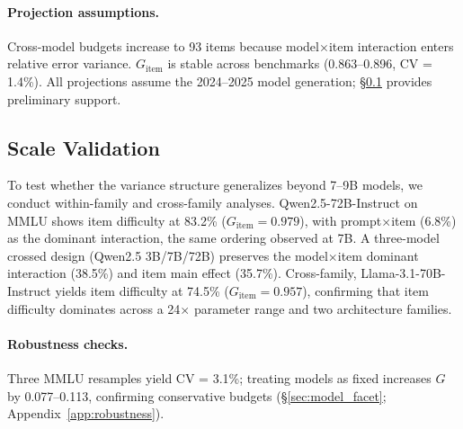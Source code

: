 \begin{table}[t]
\centering
\caption{Cross-model D-study reproducibility budgets with 95\% bootstrap CIs. $n_{G \geq 0.80}$: items needed. Multi = multi-facet (2,304 cond.); Total = items $\times$ 2,304. Single = single-condition (total evals = item count).}
\label{tab:dstudy_cross}
\scriptsize
{}
\end{table}

\paragraph{Projection assumptions.} Cross-model budgets increase to 93 items because model$\times$item interaction enters relative error variance. $G_\text{item}$ is stable across benchmarks (0.863--0.896, CV = 1.4\%). All projections assume the 2024--2025 model generation; \S\ref{sec:scale_validation} provides preliminary support.

\subsection{Scale Validation}
\label{sec:scale_validation}

To test whether the variance structure generalizes beyond 7--9B models, we conduct within-family and cross-family analyses. Qwen2.5-72B-Instruct on MMLU shows item difficulty at 83.2\% ($G_\text{item} = 0.979$), with prompt$\times$item (6.8\%) as the dominant interaction, the same ordering observed at 7B. A three-model crossed design (Qwen2.5 3B/7B/72B) preserves the model$\times$item dominant interaction (38.5\%) and item main effect (35.7\%). Cross-family, Llama-3.1-70B-Instruct yields item difficulty at 74.5\% ($G_\text{item} = 0.957$), confirming that item difficulty dominates across a 24$\times$ parameter range and two architecture families.

\paragraph{Robustness checks.} Three MMLU resamples yield CV = 3.1\%; treating models as fixed increases $G$ by 0.077--0.113, confirming conservative budgets (\S\ref{sec:model_facet}; Appendix~\ref{app:robustness}).
